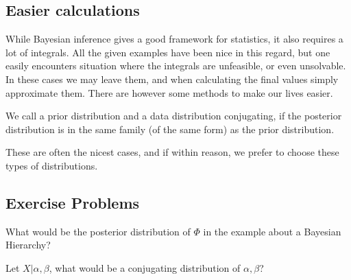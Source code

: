 \subsection{Easier calculations}
While Bayesian inference gives a good framework for statistics, it also requires a lot of integrals. All the given examples have been nice in this regard, but one easily encounters situation where the integrals are unfeasible, or even unsolvable. In these cases we may leave them, and when calculating the final values simply approximate them. There are however some methods to make our lives easier.






\begin{definition}
	We call a prior distribution and a data distribution conjugating, if the posterior distribution is in the same family (of the same form) as the prior distribution.
\end{definition}

\begin{obs}
	These are often the nicest cases, and if within reason, we prefer to choose these types of distributions.
\end{obs}


\subsection{Exercise Problems}
\begin{problem}
	What would be the posterior distribution of \(\Phi \) in the example about a Bayesian Hierarchy?
\end{problem}


\begin{problem}
	Let \(X| \alpha , \beta \), what would be a conjugating distribution of \(\alpha, \beta \)? 
\end{problem}

